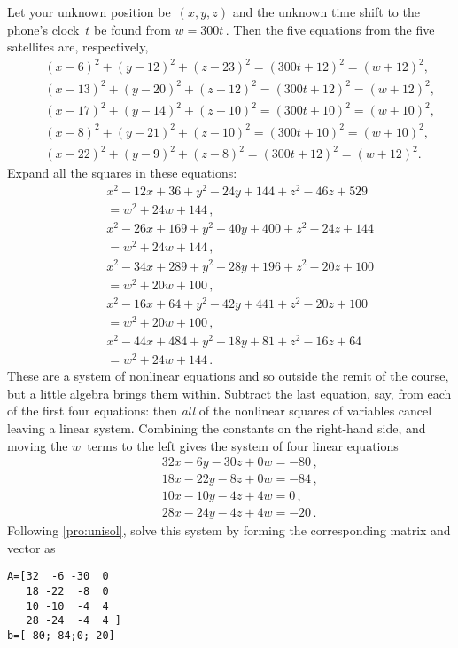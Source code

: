 \begin{example}
\begin{solution} 
Let your unknown position be~\((x,y,z)\) and the unknown time shift to the phone's clock~\(t\) be found from \(w=300t\)\,.
Then the five equations from the five satellites are, respectively,
\begin{eqnarray*}
&&(x-6)^2+(y-12)^2+(z-23)^2=(300t+12)^2=(w+12)^2,
\\&&(x-13)^2+(y-20)^2+(z-12)^2=(300t+12)^2=(w+12)^2,
\\&&(x-17)^2+(y-14)^2+(z-10)^2=(300t+10)^2=(w+10)^2,
\\&&(x-8)^2+(y-21)^2+(z-10)^2=(300t+10)^2=(w+10)^2,
\\&&(x-22)^2+(y-9)^2+(z-8)^2=(300t+12)^2=(w+12)^2.
\end{eqnarray*}
Expand all the squares in these equations:
\begin{eqnarray*}
&&x^2-12x+36+y^2-24y+144+z^2-46z+529\\&&{}=w^2+24w+144\,,
\\&&x^2-26x+169+y^2-40y+400+z^2-24z+144\\&&{}=w^2+24w+144\,,
\\&&x^2-34x+289+y^2-28y+196+z^2-20z+100\\&&{}=w^2+20w+100\,,
\\&&x^2-16x+64+y^2-42y+441+z^2-20z+100\\&&{}=w^2+20w+100\,,
\\&&x^2-44x+484+y^2-18y+81+z^2-16z+64\\&&{}=w^2+24w+144\,.
\end{eqnarray*}
These are a system of nonlinear equations and so outside the remit of the course, but a little algebra brings them within.
Subtract the last equation, say, from each of the first four equations: then \emph{all} of the nonlinear squares of variables cancel leaving a linear system.
Combining the constants on the right-hand side, and moving the \(w\)~terms to the left gives the system of four linear equations
\begin{eqnarray*}
&&32x-6y-30z+0w=-80\,,
\\&&18x-22y-8z+0w=-84\,,
\\&&10x-10y-4z+4w=0\,,
\\&&28x-24y-4z+4w=-20\,.
\end{eqnarray*}
Following \autoref{pro:unisol}, solve this system by forming the corresponding matrix and vector as
\begin{verbatim}
A=[32  -6 -30  0
   18 -22  -8  0
   10 -10  -4  4
   28 -24  -4  4 ]
b=[-80;-84;0;-20]
\end{verbatim}

\end{solution}
\end{example}

